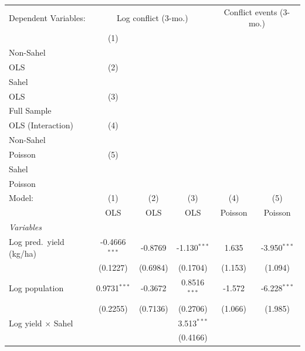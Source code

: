
\begingroup
\centering
\begin{tabular}{lccccc}
   \tabularnewline \midrule \midrule
   Dependent Variables: & \multicolumn{3}{c}{Log conflict (3-mo.)} & \multicolumn{2}{c}{Conflict events (3-mo.)}\\
                             & (1)\\Non-Sahel\\OLS     & (2)\\Sahel\\OLS     & (3)\\Full Sample\\OLS (Interaction)     & (4)\\Non-Sahel\\Poisson     & (5)\\Sahel\\Poisson \\       
   Model:                    & (1)                     & (2)                 & (3)                                     & (4)                         & (5)\\  
                             &  OLS                    & OLS                 & OLS                                     & Poisson                     & Poisson\\  
   \midrule
   \emph{Variables}\\
   Log pred.\ yield (kg/ha)  & -0.4666$^{***}$         & -0.8769             & -1.130$^{***}$                          & 1.635                       & -3.950$^{***}$\\   
                             & (0.1227)                & (0.6984)            & (0.1704)                                & (1.153)                     & (1.094)\\   
   Log population            & 0.9731$^{***}$          & -0.3672             & 0.8516$^{***}$                          & -1.572                      & -6.228$^{***}$\\   
                             & (0.2255)                & (0.7136)            & (0.2706)                                & (1.066)                     & (1.985)\\   
   Log yield $\times$ Sahel  &                         &                     & 3.513$^{***}$                           &                             &   \\   
                             &                         &                     & (0.4166)                                &                             &   \\   

\end{tabular}
